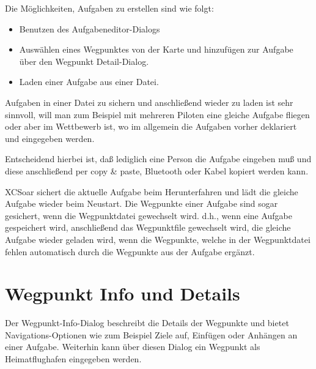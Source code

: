 Die Möglichkeiten, Aufgaben zu erstellen sind wie folgt:
\begin{itemize}
\item Benutzen des Aufgabeneditor-Dialogs
\item Auswählen eines Wegpunktes von der Karte und hinzufügen zur Aufgabe über den Wegpunkt Detail-Dialog.
\item Laden einer Aufgabe aus einer Datei.
\end{itemize}

\tip Aufgaben in einer Datei zu sichern und anschließend wieder zu laden ist sehr sinnvoll,  will man zum Beispiel mit mehreren Piloten eine gleiche Aufgabe fliegen oder aber im Wettbewerb ist, wo im  allgemein die Aufgaben vorher deklariert und eingegeben werden.

Entscheidend hierbei ist, daß lediglich eine Person die Aufgabe eingeben muß und diese anschließend  per copy \& paste,  Bluetooth oder Kabel kopiert werden kann.

\textsf{XCSoar} sichert die aktuelle Aufgabe beim Herunterfahren und lädt die gleiche Aufgabe wieder beim Neustart.  Die Wegpunkte einer Aufgabe sind sogar gesichert, wenn die Wegpunktdatei gewechselt wird. d.h., wenn eine Aufgabe gespeichert wird, anschließend das Wegpunktfile gewechselt wird, die gleiche Aufgabe wieder geladen  wird, wenn die Wegpunkte, welche in der Wegpunktdatei  fehlen automatisch durch die Wegpunkte aus der Aufgabe ergänzt.

\section{Wegpunkt Info und Details }

Der Wegpunkt-Info-Dialog beschreibt die Details der Wegpunkte  und bietet Navigations-Optionen wie zum Beispiel \textsf{Ziele auf}, \textsf{Einfügen} oder \textsf{Anhängen} an einer Aufgabe. Weiterhin kann über diesen Dialog ein Wegpunkt als Heimatflughafen eingegeben werden.

